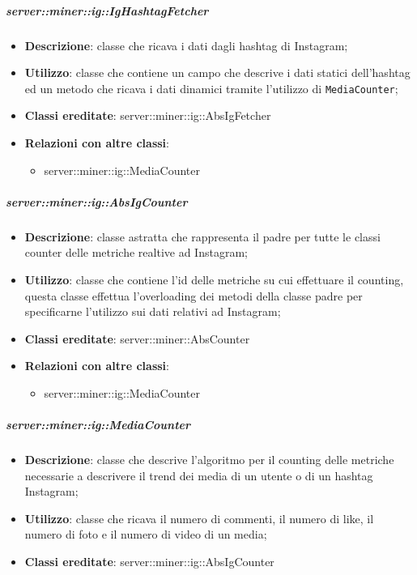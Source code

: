 	\subparagraph{server::miner::ig::IgHashtagFetcher} %
		\label{subp:server_miner_ig_IgHashtagFetcher}
			\begin{itemize}
				\item \textbf{Descrizione}: classe che ricava i dati dagli hashtag di Instagram;
				\item \textbf{Utilizzo}: classe che contiene un campo che descrive i dati statici dell'hashtag ed un metodo che ricava i dati dinamici tramite l'utilizzo di \texttt{MediaCounter};
				\item \textbf{Classi ereditate}: server::miner::ig::AbsIgFetcher
				\item \textbf{Relazioni con altre classi}:
					\begin{itemize}
						\item server::miner::ig::MediaCounter
					\end{itemize}
			\end{itemize}

	\subparagraph{server::miner::ig::AbsIgCounter} %
		\label{subp:server_miner_ig_AbsIgCounter}
			\begin{itemize}
				\item \textbf{Descrizione}: classe astratta che rappresenta il padre per tutte le classi counter delle metriche realtive ad Instagram;
				\item \textbf{Utilizzo}: classe che contiene l’id delle metriche su cui effettuare il counting, questa classe effettua l'overloading dei metodi della classe padre per specificarne l’utilizzo sui dati relativi ad Instagram;
				\item \textbf{Classi ereditate}: server::miner::AbsCounter
				\item \textbf{Relazioni con altre classi}:
					\begin{itemize}
						\item server::miner::ig::MediaCounter
					\end{itemize}
			\end{itemize}


	\subparagraph{server::miner::ig::MediaCounter} %
		\label{subp:server_miner_ig_MediaCounter}
			\begin{itemize}
				\item \textbf{Descrizione}: classe che descrive l'algoritmo per il counting delle metriche necessarie a descrivere il trend dei media di un utente o di un hashtag  Instagram;
				\item \textbf{Utilizzo}: classe che ricava il numero di commenti, il numero di like, il numero di foto e il numero di video di un media;
				\item \textbf{Classi ereditate}: server::miner::ig::AbsIgCounter
			\end{itemize}


